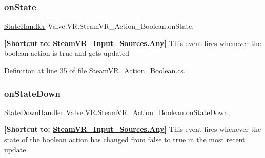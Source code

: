 \mbox{\label{class_valve_1_1_v_r_1_1_steam_v_r___action___boolean_ae12c666fba19bc6ed701a72bc8cdc9ed}} 
\subsubsection{\texorpdfstring{onState}{onState}}
{\footnotesize\ttfamily \mbox{\hyperlink{class_valve_1_1_v_r_1_1_steam_v_r___action___boolean_a59bb3ba4454fcebc2f1d2ddd661dd38f}{State\+Handler}} Valve.\+V\+R.\+Steam\+V\+R\+\_\+\+Action\+\_\+\+Boolean.\+on\+State\hspace{0.3cm}{\ttfamily [add]}, {\ttfamily [remove]}}



{\bfseries{\mbox{[}Shortcut to\+: \mbox{\hyperlink{namespace_valve_1_1_v_r_a82e5bf501cc3aa155444ee3f0662853faed36a1ef76a59ee3f15180e0441188ad}{Steam\+V\+R\+\_\+\+Input\+\_\+\+Sources.\+Any}}\mbox{]}}} This event fires whenever the boolean action is true and gets updated 



Definition at line 35 of file Steam\+V\+R\+\_\+\+Action\+\_\+\+Boolean.\+cs.

\mbox{\label{class_valve_1_1_v_r_1_1_steam_v_r___action___boolean_af66c5068d4d64878a5ae1b5fc0a70973}} 
\subsubsection{\texorpdfstring{onStateDown}{onStateDown}}
{\footnotesize\ttfamily \mbox{\hyperlink{class_valve_1_1_v_r_1_1_steam_v_r___action___boolean_a529f46e4f0459edb2641bbb382d10614}{State\+Down\+Handler}} Valve.\+V\+R.\+Steam\+V\+R\+\_\+\+Action\+\_\+\+Boolean.\+on\+State\+Down\hspace{0.3cm}{\ttfamily [add]}, {\ttfamily [remove]}}



{\bfseries{\mbox{[}Shortcut to\+: \mbox{\hyperlink{namespace_valve_1_1_v_r_a82e5bf501cc3aa155444ee3f0662853faed36a1ef76a59ee3f15180e0441188ad}{Steam\+V\+R\+\_\+\+Input\+\_\+\+Sources.\+Any}}\mbox{]}}} This event fires whenever the state of the boolean action has changed from false to true in the most recent update 



